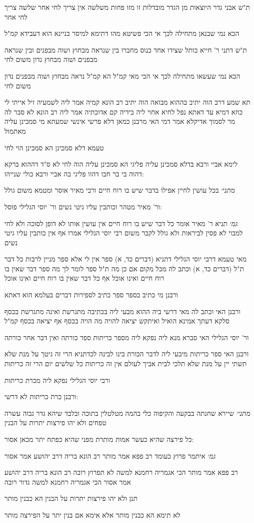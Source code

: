 \documentclass[12pt, openany]{book}
\newcommand{\sethebfont}{
\fontsize{10.5pt}{21.0pt} \selectfont
}
\newcommand{\textblock}[1]{
{\sethebfont #1\\}	
}
\begin{document}
\textblock{ת"ש אבני גדר היוצאות מן הגדר מובדלות זו מזו פחות משלשה אין צריך לחי אחר שלשה צריך לחי אחר}
\textblock{הכא נמי שבנאן מתחילה לכך אי הכי פשיטא מהו דתימא למיסר בניינא הוא דעבידא קמ"ל}
\textblock{ת"ש דתני ר' חייא כותל שצידו אחד כנוס מחברו בין שנראה מבחוץ ושוה מבפנים ובין שנראה מבפנים ושוה מבחוץ נדון משום לחי}
\textblock{הכא נמי שעשאו מתחילה לכך אי הכי מאי קמ"ל הא קמ"ל נראה מבחוץ ושוה מבפנים נדון משום לחי}
\textblock{תא שמע דרב הוה יתיב בההוא מבואה הוה יתיב רב הונא קמיה אמר ליה לשמעיה זיל אייתי לי כוזא דמיא עד דאתא נפל לחיא אחוי ליה בידיה קם אדוכתיה אמר ליה רב הונא לא סבר לה מר לסמוך אדיקלא אמר דמי האי מרבנן כמאן דלא פרשי אינשי שמעתא מי סמכינן עליה מאתמול}
\textblock{טעמא דלא סמכינן הא סמכינן הוי לחי}
\textblock{לימא אביי ורבא בדלא סמכינן עליה פליגי הא סמכינן עליה הוה לחי לא ס"ד דההוא ברקא דהוה בי בר חבו דהוו פליגי בה אביי ורבא כולי שנייהו:}
\textblock{{\large\emph{מתני׳}} בכל עושין לחיין אפילו בדבר שיש בו רוח חיים ורבי מאיר אוסר ומטמא משום גולל}
\textblock{ור' מאיר מטהר וכותבין עליו גיטי נשים ור' יוסי הגלילי פוסל:}
\textblock{{\large\emph{גמ׳}} תניא ר' מאיר אומר כל דבר שיש בו רוח חיים אין עושין אותו לא דופן לסוכה ולא לחי למבוי לא פסין לביראות ולא גולל לקבר משום רבי יוסי הגלילי אמרו אף אין כותבין עליו גיטי נשים}
\textblock{מאי טעמא דרבי יוסי הגלילי דתניא (דברים כד, א) ספר אין לי אלא ספר מניין לרבות כל דבר ת"ל (דברים כד, א) וכתב לה מכל מקום אם כן מה ת"ל ספר לומר לך מה ספר דבר שאין בו רוח חיים ואינו אוכל אף כל דבר שאין בו רוח חיים ואינו אוכל}
\textblock{ורבנן מי כתיב בספר ספר כתיב לספירות דברים בעלמא הוא דאתא}
\textblock{ורבנן האי וכתב לה מאי דרשי ביה ההוא מבעי ליה בכתיבה מתגרשת ואינה מתגרשת בכסף סלקא דעתך אמינא הואיל ואיתקש יציאה להויה מה הויה בכסף אף יציאה בכסף קמ"ל}
\textblock{ור' יוסי הגלילי האי סברא מנא ליה נפקא ליה מספר כריתות ספר כורתה ואין דבר אחר כורתה}
\textblock{ורבנן האי ספר כריתות מיבעי ליה לדבר הכורת בינו לבינה לכדתניא הרי זה גיטך על מנת שלא תשתי יין על מנת שלא תלכי לבית אביך לעולם אין זה כריתות כל שלשים יום הרי זה כריתות}
\textblock{ורבי יוסי הגלילי נפקא ליה מכרת כריתות}
\textblock{ורבנן כרת כריתות לא דרשי:}
\textblock{{\large\emph{מתני׳}} שיירא שחנתה בבקעה והקיפוה כלי בהמה מטלטלין בתוכה ובלבד שיהא גדר גבוה עשרה טפחים ולא יהו פירצות יתרות על הבנין}
\textblock{כל פירצה שהיא כעשר אמות מותרת מפני שהיא כפתח יתר מכאן אסור:}
\textblock{{\large\emph{גמ׳}} איתמר פרוץ כעומד רב פפא אמר מותר רב הונא בריה דרב יהושע אמר אסור}
\textblock{רב פפא אמר מותר הכי אגמריה רחמנא למשה לא תפרוץ רובה רב הונא בריה דרב יהושע אמר אסור הכי אגמריה רחמנא למשה גדור רובה}
\textblock{תנן ולא יהו פירצות יתרות על הבנין הא כבנין מותר}
\textblock{לא תימא הא כבנין מותר אלא אימא אם בנין יתר על הפירצה מותר}
\end{document}
